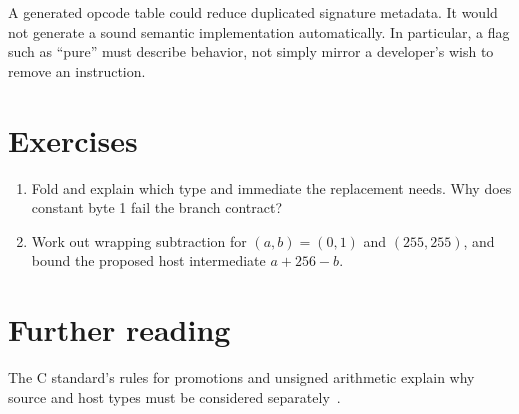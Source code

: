 A generated opcode table could reduce duplicated signature metadata.
It would not generate a sound semantic implementation automatically.
In particular, a flag such as \enquote{pure} must describe behavior, not simply mirror a developer's wish to remove an instruction.

\section{Exercises}
\label{sec:pebble-four-exercises}
\begin{enumerate}
\item \label{ex:pebble-bool} Fold  and explain which type and immediate the replacement needs. Why does constant byte 1 fail the branch contract?
\item \label{ex:pebble-sub} Work out wrapping subtraction for $(a,b)=(0,1)$ and $(255,255)$, and bound the proposed host intermediate $a+256-b$.
\end{enumerate}

\section{Further reading}
\label{sec:pebble-four-reading}
The C standard's rules for promotions and unsigned arithmetic explain why source and host types must be considered separately~\cite[Sections~6.3.1.1 and~6.2.5]{wg14-2011-c11}.
